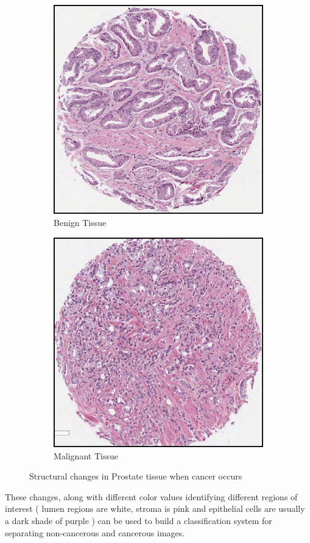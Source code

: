 \begin{figure}[!htb]
\centering
\captionsetup{justification=centering}
\begin{subfigure}{.5\textwidth}
	\centering
	\includegraphics[scale=0.3]{figs/tissue_structure2.png}
	\caption{Benign Tissue}\label{fig:tissue_structure2}
	\centering
\end{subfigure}
\begin{subfigure}{.5\textwidth}
	\centering
	\includegraphics[scale=0.3]{figs/tissue_structure3.png}
	\caption{Malignant Tissue}\label{fig:tissue_structure2}
	\centering
\end{subfigure}
\caption{Structural changes in Prostate tissue when cancer occurs}
\label{fig:tissue_types}
\centering
\end{figure}

These changes, along with different color values identifying different regions of interest ( lumen regions are white, stroma is pink and epithelial cells are usually a dark shade of purple ) can be used to build a classification system for separating non-cancerous and cancerous images.
